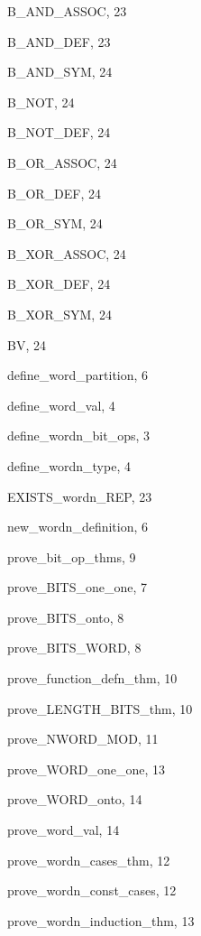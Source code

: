 \begin{theindex}

  \item {\ptt B\_AND\_ASSOC}, 23
  \item {\ptt B\_AND\_DEF}, 23
  \item {\ptt B\_AND\_SYM}, 24
  \item {\ptt B\_NOT}, 24
  \item {\ptt B\_NOT\_DEF}, 24
  \item {\ptt B\_OR\_ASSOC}, 24
  \item {\ptt B\_OR\_DEF}, 24
  \item {\ptt B\_OR\_SYM}, 24
  \item {\ptt B\_XOR\_ASSOC}, 24
  \item {\ptt B\_XOR\_DEF}, 24
  \item {\ptt B\_XOR\_SYM}, 24
  \item {\ptt BV}, 24

  \indexspace

  \item {\ptt define\_word\_partition}, 6
  \item {\ptt define\_word\_val}, 4
  \item {\ptt define\_wordn\_bit\_ops}, 3
  \item {\ptt define\_wordn\_type}, 4

  \indexspace

  \item {\ptt EXISTS\_wordn\_REP}, 23

  \indexspace

  \item {\ptt new\_wordn\_definition}, 6

  \indexspace

  \item {\ptt prove\_bit\_op\_thms}, 9
  \item {\ptt prove\_BITS\_one\_one}, 7
  \item {\ptt prove\_BITS\_onto}, 8
  \item {\ptt prove\_BITS\_WORD}, 8
  \item {\ptt prove\_function\_defn\_thm}, 10
  \item {\ptt prove\_LENGTH\_BITS\_thm}, 10
  \item {\ptt prove\_NWORD\_MOD}, 11
  \item {\ptt prove\_WORD\_one\_one}, 13
  \item {\ptt prove\_WORD\_onto}, 14
  \item {\ptt prove\_word\_val}, 14
  \item {\ptt prove\_wordn\_cases\_thm}, 12
  \item {\ptt prove\_wordn\_const\_cases}, 12
  \item {\ptt prove\_wordn\_induction\_thm}, 13


\end{theindex}
